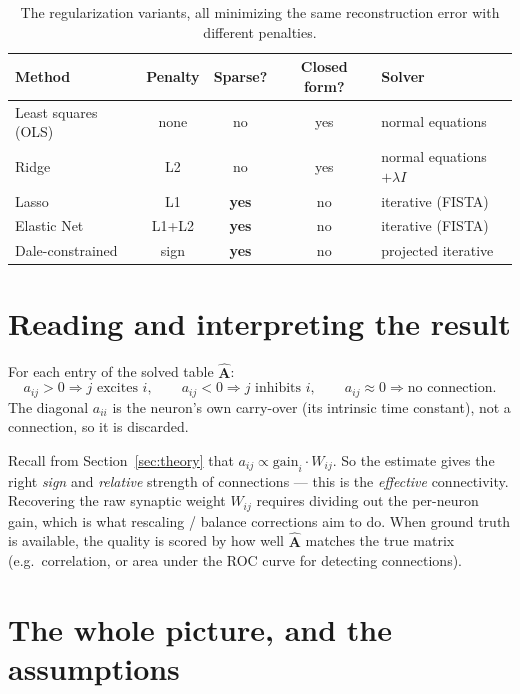 \documentclass[11pt,a4paper]{article}
\newcommand{\Amat}{\mathbf{A}}
\begin{document}
\begin{table}[h]
\centering
\renewcommand{\arraystretch}{1.2}
\begin{tabular}{lcccl}
\toprule
\textbf{Method} & \textbf{Penalty} & \textbf{Sparse?} & \textbf{Closed form?} & \textbf{Solver}\\
\midrule
Least squares (OLS) & none & no & yes & normal equations\\
Ridge & L2 & no & yes & normal equations $+\lambda I$\\
Lasso & L1 & \textbf{yes} & no & iterative (FISTA)\\
Elastic Net & L1+L2 & \textbf{yes} & no & iterative (FISTA)\\
Dale-constrained & sign & \textbf{yes} & no & projected iterative\\
\bottomrule
\end{tabular}
\caption{The regularization variants, all minimizing the same reconstruction
error with different penalties.}
\end{table}

\section{Reading and interpreting the result}

For each entry of the solved table $\widehat{\Amat}$:
\[
a_{ij}>0 \Rightarrow \text{$j$ excites $i$},\qquad
a_{ij}<0 \Rightarrow \text{$j$ inhibits $i$},\qquad
a_{ij}\approx 0 \Rightarrow \text{no connection.}
\]
The diagonal $a_{ii}$ is the neuron's own carry-over (its intrinsic time
constant), not a connection, so it is discarded.

Recall from Section~\ref{sec:theory} that $a_{ij}\propto \text{gain}_i\cdot
W_{ij}$. So the estimate gives the right \emph{sign} and \emph{relative} strength
of connections --- this is the \emph{effective} connectivity. Recovering the raw
synaptic weight $W_{ij}$ requires dividing out the per-neuron gain, which is what
rescaling / balance corrections aim to do. When ground truth is available, the
quality is scored by how well $\widehat{\Amat}$ matches the true matrix (e.g.\
correlation, or area under the ROC curve for detecting connections).

\section{The whole picture, and the assumptions}
\end{document}
